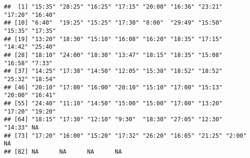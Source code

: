 \documentclass[
]{article}
\newenvironment{Shaded}{\begin{snugshade}}{\end{snugshade}}
\newcommand{\AttributeTok}[1]{\textcolor[rgb]{0.77,0.63,0.00}{#1}}
\newcommand{\CommentTok}[1]{\textcolor[rgb]{0.56,0.35,0.01}{\textit{#1}}}
\newcommand{\ControlFlowTok}[1]{\textcolor[rgb]{0.13,0.29,0.53}{\textbf{#1}}}
\newcommand{\DecValTok}[1]{\textcolor[rgb]{0.00,0.00,0.81}{#1}}
\newcommand{\FunctionTok}[1]{\textcolor[rgb]{0.00,0.00,0.00}{#1}}
\newcommand{\NormalTok}[1]{#1}
\newcommand{\OtherTok}[1]{\textcolor[rgb]{0.56,0.35,0.01}{#1}}
\newcommand{\SpecialCharTok}[1]{\textcolor[rgb]{0.00,0.00,0.00}{#1}}
\newcommand{\StringTok}[1]{\textcolor[rgb]{0.31,0.60,0.02}{#1}}
\begin{document}
\begin{Shaded}
\end{Shaded}

\begin{verbatim}
##  [1] "15:35" "28:25" "16:25" "17:15" "20:00" "16:36" "23:21" "17:20" "16:40"
## [10] "6:40"  "19:25" "15:25" "17:30" "8:00"  "29:49" "15:50" "15:35" "17:35"
## [19] "13:20" "18:30" "15:10" "16:08" "16:20" "18:35" "17:15" "14:42" "25:40"
## [28] "18:10" "24:00" "18:30" "13:47" "18:15" "18:35" "15:08" "16:58" "7:33" 
## [37] "14:25" "17:38" "14:50" "12:05" "15:38" "18:52" "18:52" "25:32" "18:54"
## [46] "20:10" "17:00" "16:00" "20:10" "15:10" "17:00" "15:13" "20:00" "16:41"
## [55] "24:40" "11:10" "14:50" "15:00" "15:00" "17:00" "13:20" "17:20" "19:20"
## [64] "18:15" "17:30" "12:10" "9:30"  "18:30" "27:05" "12:30" "14:33" NA     
## [73] "17:20" "16:00" "15:20" "17:32" "26:20" "16:05" "21:25" "2:00"  NA     
## [82] NA      NA      NA      NA
\end{verbatim}
\end{document}
